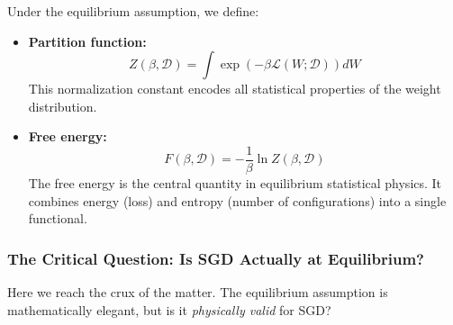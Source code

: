 \documentclass[
  journal=largetwo,
  year=2025,
  volume=37,
]{cup-journal}
\begin{document}
\begin{definition}\label{def:partition_free_energy}
Under the equilibrium assumption, we define:
\begin{itemize}
    \item \textbf{Partition function:}
    \begin{equation}
        Z(\beta, \mathcal{D}) = \int \exp\left( -\beta \mathcal{L}(W; \mathcal{D}) \right) dW
    \end{equation}
    This normalization constant encodes all statistical properties of the weight distribution.
    
    \item \textbf{Free energy:}
    \begin{equation}
        F(\beta, \mathcal{D}) = -\frac{1}{\beta} \ln Z(\beta, \mathcal{D})
    \end{equation}
    The free energy is the central quantity in equilibrium statistical physics. It combines energy (loss) and entropy (number of configurations) into a single functional.
\end{itemize}
\end{definition}

\subsubsection{The Critical Question: Is SGD Actually at Equilibrium?}

Here we reach the crux of the matter. The equilibrium assumption is mathematically elegant, but is it \textit{physically valid} for SGD?
\end{document}
